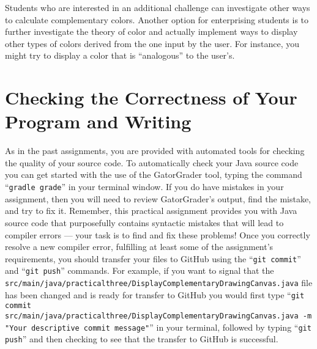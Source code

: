 \documentclass[11pt]{article}
\newcommand{\mainprogramsource}{\lstinline{src/main/java/practicalthree/DisplayComplementaryDrawingCanvas.java}}
\newcommand{\secondprogramsource}{\lstinline{src/main/java/practicalthree/DisplayComplementaryDrawingCanvas.java}}
\newcommand{\gatorgraderstart}{\command{gradle grade}}
\newcommand{\gitcommit}{\command{git commit}}
\newcommand{\gitpush}{\command{git push}}
\newcommand{\gitcommitmainprogram}{\command{git commit src/main/java/practicalthree/DisplayComplementaryDrawingCanvas.java -m "Your
descriptive commit message"}}
\newcommand{\command}[1]{``\lstinline{#1}''}
\begin{document}
Students who are interested in an additional challenge can investigate other
ways to calculate complementary colors. Another option for enterprising students
is to further investigate the theory of color and actually implement ways to
display other types of colors derived from the one input by the user. For
instance, you might try to display a color that is ``analogous'' to the user's.

\section*{Checking the Correctness of Your Program and Writing}

As in the past assignments, you are provided with automated tools for checking
the quality of your source code. To automatically check your Java source code
you can get started with the use of the GatorGrader tool, typing the command
\gatorgraderstart{} in your terminal window. If you do have mistakes in your
assignment, then you will need to review GatorGrader's output, find the mistake,
and try to fix it. Remember, this practical assignment provides you with Java
source code that purposefully contains syntactic mistakes that will lead to
compiler errors --- your task is to find and fix these problems! Once you
correctly resolve a new compiler error, fulfilling at least some of the
assignment's requirements, you should transfer your files to GitHub using the
\gitcommit{} and \gitpush{} commands. For example, if you want to signal that
the \mainprogramsource{} file has been changed and is ready for transfer to
GitHub you would first type \gitcommitmainprogram{} in your terminal, followed
by typing \gitpush{} and then checking to see that the transfer to GitHub is
successful.

\end{document}
